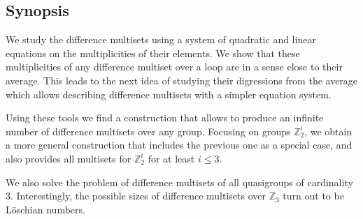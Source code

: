 \subsection{Synopsis}

    We study the difference multisets using a system of quadratic and linear equations on the multiplicities of their elements. We show that these multiplicities of any difference multiset over a loop are in a sense close to their average. This leads to the next idea of studying their digressions from the average which allows describing difference multisets with a simpler equation system.

    Using these tools we find a construction that allows to produce an infinite number of difference multisets over any group. Focusing on groups $\mathbb Z_2^i$, we obtain a more general construction that includes the previous one as a special case, and also provides all multisets for $\mathbb Z_2^i$ for at least $i \leq 3$.

    We also solve the problem of difference multisets of all quasigroups of cardinality 3. Interestingly, the possible sizes of difference multisets over $\mathbb Z_3$ turn out to be Löschian numbers.
    
